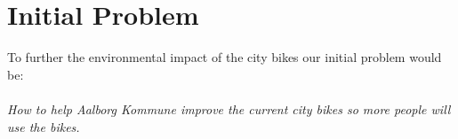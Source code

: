 \section*{Initial Problem}
To further the environmental impact of the city bikes our initial problem would be:\\\\
\textit{How to help Aalborg Kommune improve the current city bikes so more people will use the bikes.}

